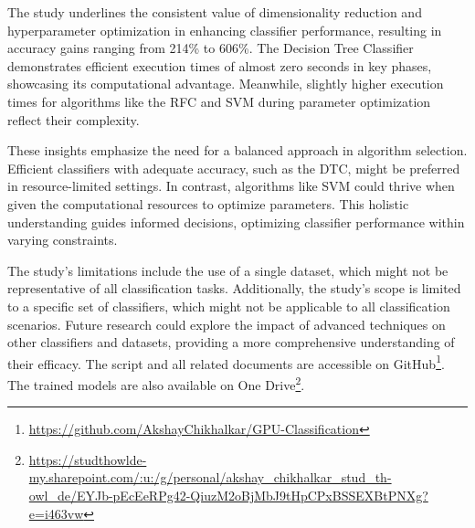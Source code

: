 \documentclass[conference,onecolumn]{IEEEtran}
\begin{document}
    The study underlines the consistent value of dimensionality reduction and hyperparameter optimization in enhancing classifier performance, resulting in accuracy gains ranging from 214\% to 606\%. The Decision Tree Classifier demonstrates efficient execution times of almost zero seconds in key phases, showcasing its computational advantage. Meanwhile, slightly higher execution times for algorithms like the RFC and SVM during parameter optimization reflect their complexity.

    These insights emphasize the need for a balanced approach in algorithm selection. Efficient classifiers with adequate accuracy, such as the DTC, might be preferred in resource-limited settings. In contrast, algorithms like SVM could thrive when given the computational resources to optimize parameters. This holistic understanding guides informed decisions, optimizing classifier performance within varying constraints.

    The study's limitations include the use of a single dataset, which might not be representative of all classification tasks. Additionally, the study's scope is limited to a specific set of classifiers, which might not be applicable to all classification scenarios. Future research could explore the impact of advanced techniques on other classifiers and datasets, providing a more comprehensive understanding of their efficacy. The script and all related documents are accessible on GitHub\footnote{\url{https://github.com/AkshayChikhalkar/GPU-Classification}}. The trained models are also available on One Drive\footnote{\url{https://studthowlde-my.sharepoint.com/:u:/g/personal/akshay_chikhalkar_stud_th-owl_de/EYJb-pEcEeRPg42-QiuzM2oBjMbJ9tHpCPxBSSEXBtPNXg?e=i463vw}}.
\end{document}
